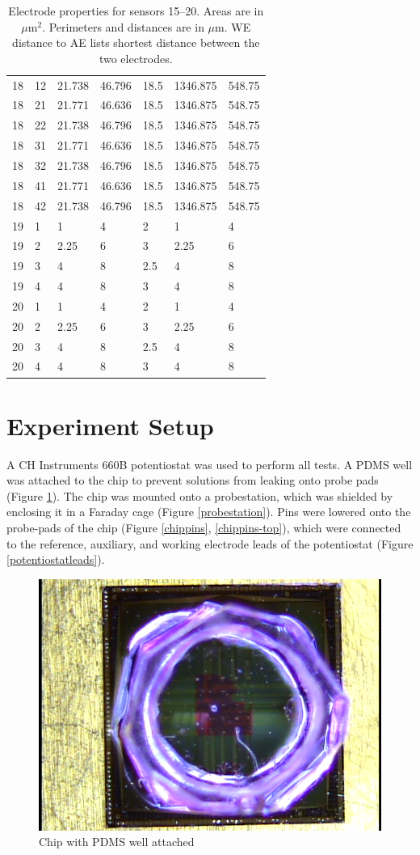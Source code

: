 \begin{table}
\begin{tabular}{lllllll}
		18 & 12 & 21.738 & 46.796 & 18.5 & 1346.875 & 548.75 \\
		18 & 21 & 21.771 & 46.636 & 18.5 & 1346.875 & 548.75 \\
		18 & 22 & 21.738 & 46.796 & 18.5 & 1346.875 & 548.75 \\
		18 & 31 & 21.771 & 46.636 & 18.5 & 1346.875 & 548.75 \\
		18 & 32 & 21.738 & 46.796 & 18.5 & 1346.875 & 548.75 \\
		18 & 41 & 21.771 & 46.636 & 18.5 & 1346.875 & 548.75 \\
		18 & 42 & 21.738 & 46.796 & 18.5 & 1346.875 & 548.75 \\
		19 & 1 & 1 & 4 & 2 & 1 & 4 \\
		19 & 2 & 2.25 & 6 & 3 & 2.25 & 6 \\
		19 & 3 & 4 & 8 & 2.5 & 4 & 8 \\
		19 & 4 & 4 & 8 & 3 & 4 & 8 \\
		20 & 1 & 1 & 4 & 2 & 1 & 4 \\
		20 & 2 & 2.25 & 6 & 3 & 2.25 & 6 \\
		20 & 3 & 4 & 8 & 2.5 & 4 & 8 \\
		20 & 4 & 4 & 8 & 3 & 4 & 8
	\end{tabular}
	\caption[Electrode properties for sensors 15--20]{Electrode properties for sensors 15--20. Areas are in $\mu \mathrm{m}^2$. Perimeters and distances are in $\mu \mathrm{m}$. WE distance to AE lists shortest distance between the two electrodes.}
	\label{electrode-properties-3}
\end{table}

\section{Experiment Setup}

A CH Instruments 660B potentiostat was used to perform all tests. A PDMS well was attached to the chip to prevent solutions from leaking onto probe pads (Figure \ref{chip-top}). The chip was mounted onto a probestation, which was shielded by enclosing it in a Faraday cage (Figure \ref{probestation}). Pins were lowered onto the probe-pads of the chip (Figure \ref{chippins}, \ref{chippins-top}), which were connected to the reference, auxiliary, and working electrode leads of the potentiostat (Figure \ref{potentiostatleads}).

\begin{figure}
	\centering
	\includegraphics[width=0.5\linewidth]{figures/chip-top.png}
	\caption{Chip with PDMS well attached}
	\label{chip-top}
\end{figure}

